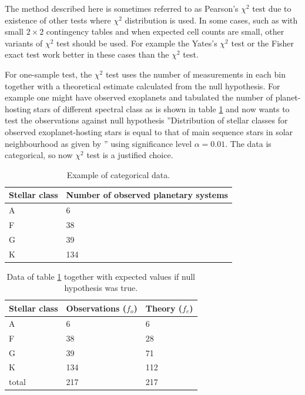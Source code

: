 \documentclass[english, oneside]{HYgradu}
\begin{document}
The method described here is sometimes referred to as Pearson's $\chi^2$ test due to existence of other tests where $\chi^2$ distribution is used. In some cases, such as with small $2 \times 2$ contingency tables and when expected cell counts are small, other variants of $\chi^2$ test should be used. For example the Yates's $\chi^2$ test or the Fisher exact test work better in these cases than the $\chi^2$ test.

For one-sample test, the $\chi^2$ test uses the number of measurements in each bin together with a theoretical estimate calculated from the null hypothesis. For example one might have observed exoplanets and tabulated the number of planet-hosting stars of different spectral class as is shown in table \ref{tab:exoplanets} and now wants 
to test the observations against null hypothesis ''Distribution of stellar classes for observed exoplanet-hosting stars is equal to that of main sequence stars in solar neighbourhood as given by \citet{ledrew2001real}'' using significance level $\alpha=0.01$. The data is categorical, so now $\chi^2$ test is a justified choice.

\begin{table}
	\centering
	\begin{tabular}{p{2cm}|p{4cm}}
		Stellar class & Number of observed planetary systems \\ \hline
		A & 6 \\
		F & 38 \\
		G & 39 \\
		K & 134
	\end{tabular}
	\caption{Example of categorical data.}
	\label{tab:exoplanets}
\end{table}

\begin{table}
	\centering
	\begin{tabular}{ l | l | l }
		Stellar class & Observations ($f_o$)& Theory ($f_e$) \\ \hline
		A & 6 & 6 \\
		F & 38 & 28 \\
		G & 39 & 71 \\
		K & 134 & 112 \\ \hline
		total & 217 & 217
	\end{tabular}
	\caption{Data of table \ref{tab:exoplanets} together with expected values if null hypothesis was true.}
	\label{tab:exoplanets-null}
\end{table}
\end{document}
